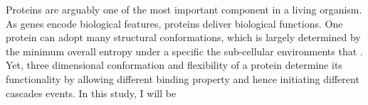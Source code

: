 Proteins are arguably one of the most important component in a living organism. As genes encode biological features, proteins deliver biological functions. One protein can adopt many structural conformations, which is largely determined by the minimum overall entropy under a specific the sub-cellular environments that . Yet, three dimensional conformation and flexibility of a protein determine its functionality by allowing different binding property and hence initiating different cascades events. In this study, I will be 